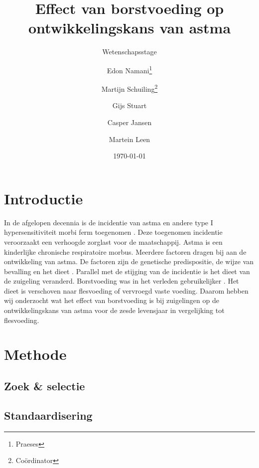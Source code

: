 \documentclass[abstract=true]{scrartcl}
\title{Effect van borstvoeding op ontwikkelingskans van astma}
\subtitle{Wetenschapsstage}
\author{Edon Namani\thanks{Praeses} \and Martijn Schuiling\thanks{Co\"ordinator} \and Gijs Stuart \and Casper Jansen \and Martein Leen}
\date{\today}
\begin{document}
\maketitle
    \begin{abstract}

    \end{abstract}

\section{Introductie}
In de afgelopen decennia is de incidentie van astma en andere type I hypersensitiviteit morbi ferm toegenomen \cite{Platts_Mills_2015}. Deze toegenomen incidentie veroorzaakt een verhoogde zorglast voor de maatschappij. Astma is een kinderlijke chronische respiratoire morbus. Meerdere factoren dragen bij aan de ontwikkeling van astma. De factoren zijn de genetische predispositie, de wijze van bevalling en het dieet \cite{abbas2017cellular,Houghteling_2015}.
Parallel met de stijging van de incidentie is het dieet van de zuigeling veranderd. Borstvoeding was in het verleden gebruikelijker \cite{world1981contemporary,Victora_2016,Rollins_2016}. Het dieet is verschoven naar flesvoeding of vervroegd vaste voeding. Daarom hebben wij onderzocht wat het effect van borstvoeding is bij zuigelingen op de ontwikkelingskans van astma voor de zesde levensjaar in vergelijking tot flesvoeding.


\section{Methode}
    \subsection{Zoek \& selectie}

    \subsection{Standaardisering}

\end{document}
